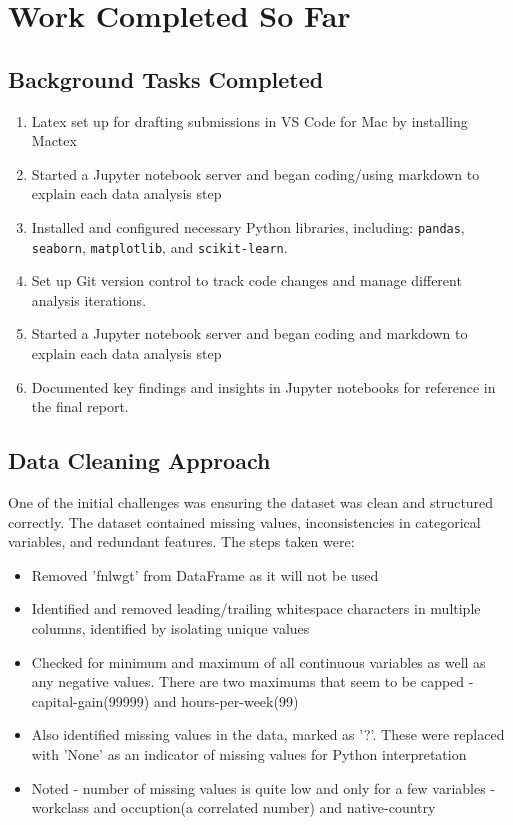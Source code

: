\documentclass[journal]{IEEEtran}
\begin{document}
\section{Work Completed So Far}

\subsection{Background Tasks Completed}
\begin{enumerate}
    \item Latex set up for drafting submissions in VS Code for Mac by installing Mactex
    \item Started a Jupyter notebook server and began coding/using markdown to explain each data analysis step
    \item Installed and configured necessary Python libraries, including: 
    \texttt{pandas}, \texttt{seaborn}, \texttt{matplotlib}, and 
    \texttt{scikit-learn}.
    \item Set up Git version control to track code changes and manage different analysis iterations.
    \item Started a Jupyter notebook server and began coding and markdown to explain each data analysis step
    \item Documented key findings and insights in Jupyter notebooks for reference in the final report.
\end{enumerate}

\subsection{Data Cleaning Approach}
One of the initial challenges was ensuring the dataset was clean and structured correctly. The dataset contained missing values, inconsistencies in categorical variables, and redundant features. The steps taken were:
\begin{itemize}
    \item Removed 'fnlwgt' from DataFrame as it will not be used
    \item Identified and removed leading/trailing whitespace characters in multiple columns, identified by isolating unique values
    \item Checked for minimum and maximum of all continuous variables as well as any negative values. There are two maximums that seem to be capped - capital-gain(99999) and hours-per-week(99)
    \item Also identified missing values in the data, marked as '?'. These were replaced with 'None' as an indicator of missing values for Python interpretation
    \item Noted - number of missing values is quite low and only for a few variables - workclass and occuption(a correlated number) and native-country
\end{itemize}
\end{document}

